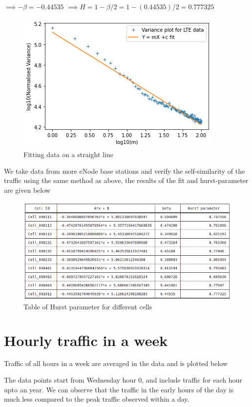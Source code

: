  $\implies  -\beta = -0.44535 $
 $\implies H =1-\beta/2=1-(0.44535)/2=0.777325$
\begin{figure}[H]
    \centering
    \includegraphics{line_fit.png}
    \caption{Fitting data on a straight line}
    \label{fig:line}
\end{figure}

We take data from more eNode base stations and verify the self-similarity of the traffic using the same method as above, the results of the fit and hurst-parameter are given below
\begin{figure}[H]
    \centering
    \includegraphics[scale =0.7]{table_H.png}
    \caption{Table of Hurst parameter for different cells}
    \label{fig:table}
\end{figure}



\section{Hourly traffic in a week}

Traffic of all hours in a week are averaged in the data and is plotted below

The data points start from Wednesday hour 0, and include traffic for each hour upto an year.
We can observe that the traffic in the early hours of the day is much less compared to the peak traffic observed within a day.

